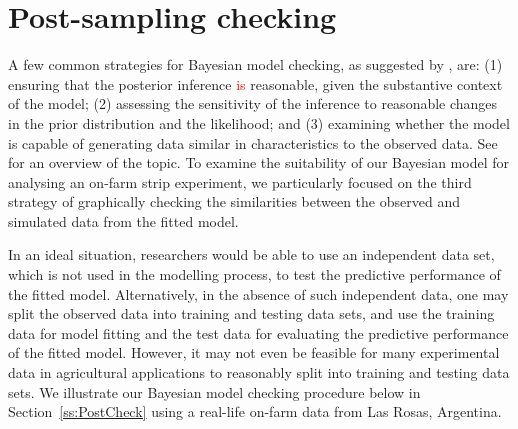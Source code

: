 \documentclass[a4paper]{article}   	%
\begin{document}
	
	
	
	\section{Post-sampling checking}\label{sec:mcmcchain}
	
	
	
	A few common strategies for Bayesian model checking, as suggested by \textcite{gelman2003Bayesian}, are: (1) ensuring that the posterior inference \textcolor{red}{is} reasonable, given the substantive context of the model; (2) assessing the sensitivity of the inference to reasonable changes in the prior distribution and the likelihood; and (3) examining whether the model is capable of generating data similar in characteristics to the observed data. See \textcite{gelman2004Exploratory, Weiss1994Pediatric, Gelman2013Bayesian, Congdon2019Bayesian} for an overview of the topic. To examine the suitability of our Bayesian model for analysing an on-farm strip experiment, we particularly focused on the third strategy of graphically checking the similarities between the observed and simulated data from the fitted model. 
	
	
	In an ideal situation, researchers would be able to use an independent data set, which is not used in the modelling process, to test the predictive performance of the fitted model. Alternatively, in the absence of such independent data, one may split the observed data into training and testing data sets, and use the training data for model fitting and the test data for evaluating the predictive performance of the fitted model. However, it may not even be feasible for many experimental data in agricultural applications to reasonably split into training and testing data sets. We illustrate our Bayesian model checking procedure below in Section~\ref{ss:PostCheck} using a real-life on-farm data from Las Rosas, Argentina. 
	
\end{document}
